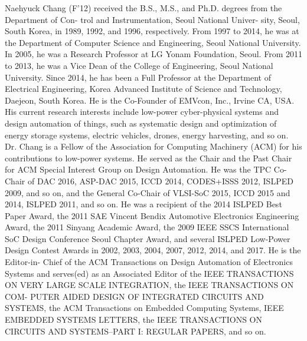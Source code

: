 \documentclass[journal]{./template/IEEEtran}
\begin{document}
\begin{IEEEbiography}{Naehyuck Chang}
(F’12) received the B.S., M.S., and Ph.D. degrees from the Department of Con- trol and Instrumentation, Seoul National Univer- sity, Seoul, South Korea, in 1989, 1992, and 1996, respectively.
From 1997 to 2014, he was at the Department of Computer Science and Engineering, Seoul National University. In 2005, he was a Research Professor at LG Yonam Foundation, Seoul. From 2011 to 2013, he was a Vice Dean of the College of Engineering, Seoul National University. Since 2014, he has been
a Full Professor at the Department of Electrical Engineering, Korea Advanced Institute of Science and Technology, Daejeon, South Korea. He is the Co-Founder of EMVcon, Inc., Irvine CA, USA. His current research interests include low-power cyber-physical systems and design automation of things, such as systematic design and optimization of energy storage systems, electric vehicles, drones, energy harvesting, and so on.
Dr. Chang is a Fellow of the Association for Computing Machinery (ACM) for his contributions to low-power systems. He served as the Chair and the Past Chair for ACM Special Interest Group on Design Automation. He was the TPC Co-Chair of DAC 2016, ASP-DAC 2015, ICCD 2014, CODES+ISSS 2012, ISLPED 2009, and so on, and the General Co-Chair of VLSI-SoC 2015, ICCD 2015 and 2014, ISLPED 2011, and so on. He was a recipient of the 2014 ISLPED Best Paper Award, the 2011 SAE Vincent Bendix Automotive Electronics Engineering Award, the 2011 Sinyang Academic Award, the 2009 IEEE SSCS International SoC Design Conference Seoul Chapter Award, and several ISLPED Low-Power Design Contest Awards in 2002, 2003, 2004, 2007, 2012, 2014, and 2017. He is the Editor-in- Chief of the ACM Transactions on Design Automation of Electronics Systems and serves(ed) as an Associated Editor of the IEEE TRANSACTIONS ON VERY LARGE SCALE INTEGRATION, the IEEE TRANSACTIONS ON COM- PUTER AIDED DESIGN OF INTEGRATED CIRCUITS AND SYSTEMS, the ACM Transactions on Embedded Computing Systems, IEEE EMBEDDED SYSTEMS LETTERS, the IEEE TRANSACTIONS ON CIRCUITS AND SYSTEMS–PART I: REGULAR PAPERS, and so on.
\end{IEEEbiography}
\end{document}
